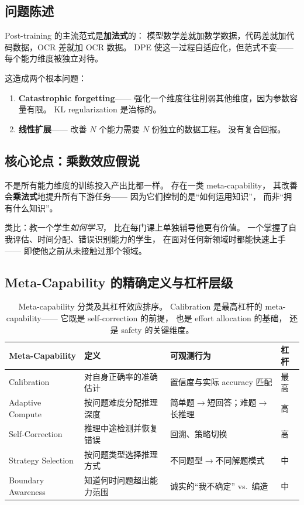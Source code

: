 \documentclass[12pt,a4paper]{article}
\begin{document}
\subsection{问题陈述}

Post-training 的主流范式是\textbf{加法式}的：
模型数学差就加数学数据，代码差就加代码数据，OCR 差就加 OCR 数据。
DPE 使这一过程自适应化，但范式不变——
每个能力维度被独立对待。

这造成两个根本问题：

\begin{enumerate}[leftmargin=2em]
  \item \textbf{Catastrophic forgetting}——
    强化一个维度往往削弱其他维度，因为参数容量有限。
    KL regularization 是治标的。

  \item \textbf{线性扩展}——
    改善 $N$ 个能力需要 $N$ 份独立的数据工程。
    没有复合回报。
\end{enumerate}

\subsection{核心论点：乘数效应假说}

\begin{insightbox}
不是所有能力维度的训练投入产出比都一样。
存在一类 meta-capability，
其改善会\textbf{乘法式}地提升所有下游任务——
因为它们控制的是``如何运用知识''，
而非``拥有什么知识''。
\end{insightbox}

\noindent
类比：教一个学生\textit{如何学习}，
比在每门课上单独辅导他更有价值。
一个掌握了自我评估、时间分配、错误识别能力的学生，
在面对任何新领域时都能快速上手——
即使他之前从未接触过那个领域。

\subsection{Meta-Capability 的精确定义与杠杆层级}

\begin{table}[h]
\centering
\small
\begin{tabular}{p{3cm}p{3.5cm}p{4cm}l}
\toprule
\textbf{Meta-Capability} & \textbf{定义} & \textbf{可观测行为} & \textbf{杠杆} \\
\midrule
Calibration
  & 对自身正确率的准确估计
  & 置信度与实际 accuracy 匹配
  & 最高 \\
Adaptive Compute
  & 按问题难度分配推理深度
  & 简单题$\rightarrow$短回答；难题$\rightarrow$长推理
  & 高 \\
Self-Correction
  & 推理中途检测并恢复错误
  & 回溯、策略切换
  & 高 \\
Strategy Selection
  & 按问题类型选择推理方式
  & 不同题型$\rightarrow$不同解题模式
  & 中 \\
Boundary Awareness
  & 知道何时问题超出能力范围
  & 诚实的``我不确定'' vs.\ 编造
  & 中 \\
\bottomrule
\end{tabular}
\caption{Meta-capability 分类及其杠杆效应排序。
Calibration 是最高杠杆的 meta-capability——
它既是 self-correction 的前提，
也是 effort allocation 的基础，
还是 safety 的关键维度。}
\label{tab:meta-cap}
\end{table}
\end{document}
